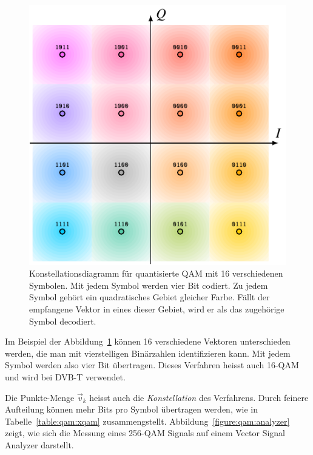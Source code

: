 \begin{figure}
\centering
\includegraphics{applications/qam/konstellation.pdf}
\caption{Konstellationsdiagramm für quantisierte QAM mit 16 verschiedenen
Symbolen.
Mit jedem Symbol werden vier Bit codiert.
Zu jedem Symbol gehört ein quadratisches Gebiet gleicher Farbe.
Fällt der empfangene Vektor in eines dieser Gebiet, wird er als
das zugehörige Symbol decodiert.
\label{figure:qam:konstellation}}
\end{figure}

Im Beispiel der Abbildung~\ref{figure:qam:konstellation} können 16 
verschiedene Vektoren unterschieden werden, die man mit vierstelligen
Binärzahlen identifizieren kann.
Mit jedem Symbol werden also vier Bit übertragen.
Dieses Verfahren heisst auch 16-QAM und wird bei DVB-T verwendet.

Die Punkte-Menge $\vec{v}_k$ heisst auch die {\em Konstellation}
des Verfahrens.
Durch feinere Aufteilung können mehr Bits pro Symbol übertragen werden,
wie in Tabelle~\ref{table:qam:xqam} zusammengstellt.
Abbildung~\ref{figure:qam:analyzer} zeigt, wie sich die Messung eines 256-QAM 
Signals auf einem Vector Signal Analyzer darstellt.

